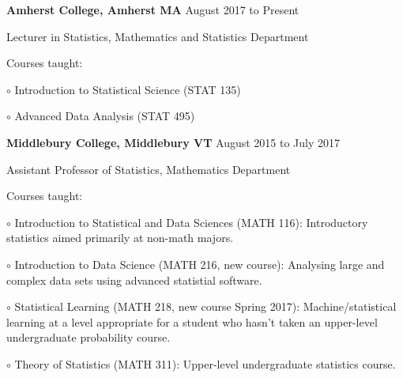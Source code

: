\documentclass[10pt]{article}
\newcommand{\halfblankline}{\quad\vspace{-0.5\baselineskip}\pagebreak[3]}
\begin{document}
\textbf{Amherst College, Amherst MA} \hfill {August 2017 to Present}
\begin{outerlist}
    \item[] Lecturer in Statistics, Mathematics and Statistics Department
    	\begin{innerlist}
		\item Courses taught:
		\begin{innerlist}
		\item[$\circ$] Introduction to Statistical Science (STAT 135)
		\item[$\circ$] Advanced Data Analysis (STAT 495)
		\end{innerlist}
	\end{innerlist}
\end{outerlist}

\halfblankline

\textbf{Middlebury College, Middlebury VT} \hfill {August 2015 to July 2017}
\begin{outerlist}
    \item[] Assistant Professor of Statistics, Mathematics Department
    	\begin{innerlist}
		\item Courses taught:
		\begin{innerlist}
		\item[$\circ$] Introduction to Statistical and Data Sciences (MATH 116):  Introductory
		statistics aimed primarily at non-math majors.
		\item[$\circ$] Introduction to Data Science (MATH 216, new course): Analysing large and complex data sets using advanced statistial software.
		\item[$\circ$] Statistical Learning (MATH 218, new course Spring 2017): Machine/statistical learning at a level appropriate for a student who hasn't taken an upper-level undergraduate
		probability course.
		\item[$\circ$] Theory of Statistics (MATH 311): Upper-level undergraduate
		statistics course.
		\end{innerlist}
	\end{innerlist}
\end{outerlist}

\halfblankline
\end{document}
